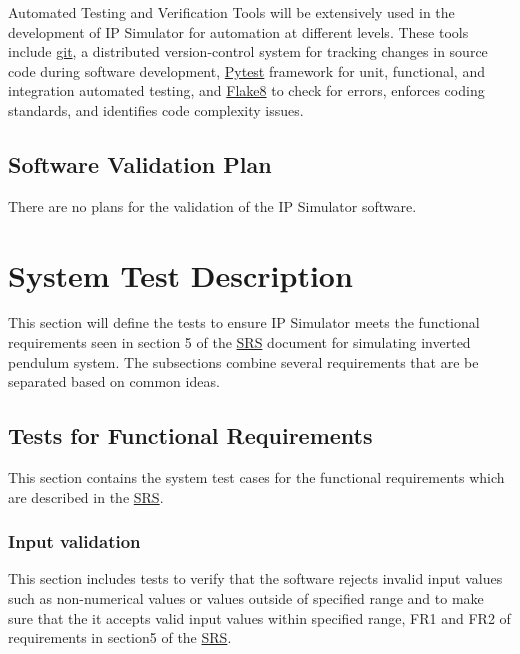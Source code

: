 \documentclass[12pt, titlepage]{article}
\begin{document}
Automated Testing and Verification Tools will be extensively used in the development of IP Simulator for automation at different levels. These tools include \href{https://github.com/MinMah23/CAS741-Project}{git}, a distributed version-control system for tracking changes in source code during software development, \href{https://docs.pytest.org/en/7.2.x/}{Pytest} framework for unit, functional, and integration automated testing, and \href{https://flake8.pycqa.org/en/latest/}{Flake8} to check for errors, enforces coding standards, and identifies code complexity issues.

\subsection{Software Validation Plan}

There are no plans for the validation of the IP Simulator software.

\section{System Test Description}\label{test}
This section will define the tests to ensure IP Simulator meets the functional requirements seen in section 5 of the \href{https://github.com/MinMah23/CAS741-Project/tree/main/docs/SRS/SRS.pdf}{SRS} document for simulating inverted pendulum system. The subsections combine several requirements that are be separated based on common ideas.

\subsection{Tests for Functional Requirements}
This section contains the system test cases for the functional requirements which are described in the  \href{https://github.com/MinMah23/CAS741-Project/tree/main/docs/SRS/SRS.pdf}{SRS}.

\subsubsection{Input validation \label{inp_val}}
This section includes tests to verify that the software rejects invalid input values such as non-numerical values or values outside of specified range and to make sure that the it accepts valid input values within specified range, FR1 and FR2 of requirements in section5 of the  \href{https://github.com/MinMah23/CAS741-Project/tree/main/docs/SRS/SRS.pdf}{SRS}.
\end{document}
